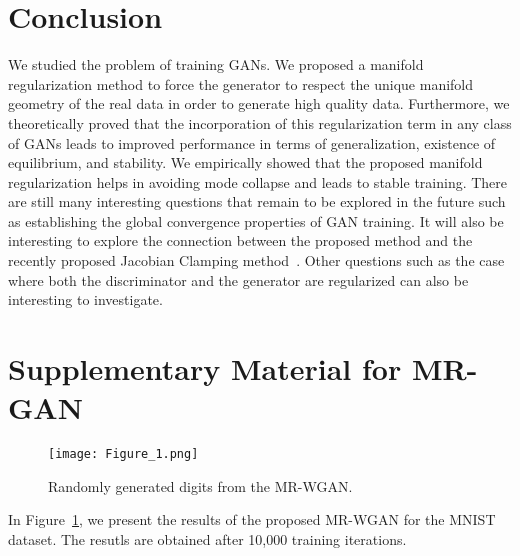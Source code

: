 \documentclass[10pt,twocolumn,letterpaper]{article}
\begin{document}
\section{Conclusion}
We studied the problem of training GANs. We proposed a manifold regularization method to force the generator to respect the unique manifold geometry of the real data in order to generate high quality data. Furthermore, we theoretically proved that the incorporation of this regularization term in any class of GANs leads to improved performance in terms of generalization, existence of equilibrium, and stability. We empirically showed that the proposed manifold regularization helps in avoiding mode collapse and leads to stable training. There are still many interesting questions that remain to be explored in the future such as establishing the global convergence properties of GAN training. It will also be interesting to explore the connection between the proposed method and the recently proposed Jacobian Clamping method~\cite{jacob_clip}. Other questions such as the case where both the discriminator and the generator are regularized can also be interesting to investigate.


{\small
	
	
}

\appendix
\onecolumn
\section*{Supplementary Material for MR-GAN }
\begin{figure}[h]
    \centering
    \texttt{[image: Figure\_1.png]}
    \caption{\small{Randomly generated digits from the MR-WGAN.}}
    \label{fig:mnist_sm}
\end{figure}
In Figure~\ref{fig:mnist_sm}, we present the results of the proposed MR-WGAN for the MNIST dataset. The resutls are obtained after 10,000 training iterations.
\end{document}

